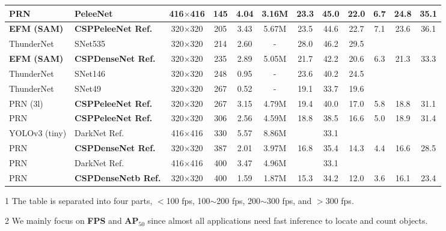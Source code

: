 \documentclass{article}
\begin{document}
\begin{table*}[t]
\begin{threeparttable}[t]
\begin{tabular}{llcccccccccc}
			PRN \cite{wang2019enriching} & PeleeNet \cite{wang2018pelee} & 416$\times$416 & 145 & 4.04 & 3.16M & 23.3 & 45.0 & 22.0 & 6.7 & 24.8 & 35.1 \\
			\midrule
			\textbf{EFM (SAM)} \cite{wang2019enriching} & \textbf{CSPPeleeNet Ref.}  & 320$\times$320 & 205 & 3.43 & 5.67M & 23.5 & 44.6 & 22.7 & 7.1 & 23.6 & 36.1 \\	
			ThunderNet \cite{qin2019thundernet} & SNet535 \cite{qin2019thundernet} & 320$\times$320 & 214 & 2.60 & - & 28.0 & 46.2 & 29.5 &  &  &  \\
			\textbf{EFM (SAM)} \cite{wang2019enriching} & \textbf{CSPDenseNet Ref.}  & 320$\times$320 & 235 & 2.89 & 5.05M & 21.7 & 42.2 & 20.6 & 6.3 & 21.3 & 33.3 \\	
			ThunderNet \cite{qin2019thundernet} & SNet146 \cite{qin2019thundernet} & 320$\times$320 & 248 & 0.95 & - & 23.6 & 40.2 & 24.5 &  &  &  \\
			ThunderNet \cite{qin2019thundernet} & SNet49 \cite{qin2019thundernet} & 320$\times$320 & 267 & 0.52 & - & 19.1 & 33.7 & 19.6 &  &  & \\	
			PRN (3l) \cite{wang2019enriching} & \textbf{CSPPeleeNet Ref.}  & 320$\times$320 & 267 & 3.15 & 4.79M & 19.4 & 40.0 & 17.0 & 5.8 & 18.8 & 31.1 \\				
			\midrule
			PRN \cite{wang2019enriching} & \textbf{CSPPeleeNet Ref.}  & 320$\times$320 & 306 & 2.56 & 4.59M & 18.8 & 38.5 & 16.6 & 5.0 & 18.9 & 31.4 \\			
			YOLOv3 (tiny) \cite{redmon2018yolov3} & DarkNet Ref. \cite{redmon2018yolov3} & 416$\times$416 & 330 & 5.57 & 8.86M &  & 33.1 &  &  &  &  \\
			PRN \cite{wang2019enriching} & \textbf{CSPDenseNet Ref.}  & 320$\times$320 & 387 & 2.01 & 3.97M & 16.8 & 35.4 & 14.3 & 4.4 & 16.6 & 28.5 \\			
			PRN \cite{wang2019enriching} & DarkNet Ref. \cite{redmon2018yolov3} & 416$\times$416 & 400 & 3.47 & 4.96M &  & 33.1 &  &  &  &  \\
			PRN \cite{wang2019enriching} & \textbf{CSPDenseNetb Ref.}  & 320$\times$320 & 400 & 1.59 & 1.87M & 15.3 & 34.2 & 12.0 & 3.6 & 16.1 & 23.4 \\				
			\midrule
			\bottomrule
		\end{tabular}
		\begin{tablenotes}[flushleft]
			\footnotesize
			\item[1] The table is separated into four parts, $<$100 fps, 100$\sim$200 fps, 200$\sim$300 fps, and $>$300 fps.
			\item[2] We mainly focus on \textbf{FPS} and \textbf{AP$_{50}$} since almost all applications need fast inference to locate and count objects.

\end{tablenotes}
\end{threeparttable}
\end{table*}
\end{document}
